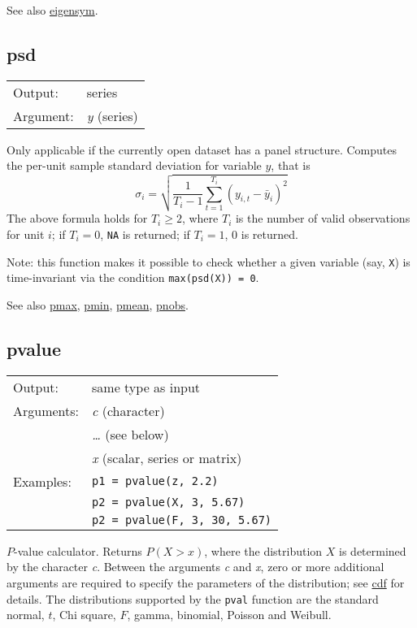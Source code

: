 	  See also \hyperlink{func-eigensym}{eigensym}.

\subsection{psd}
\hypertarget{func-psd}{}

\begin{tabular}{ll}
Output:     & series\\
Argument:   & \textsl{y} (series)\\
\end{tabular}

	  Only applicable if the currently open dataset has a panel
	  structure. Computes the per-unit sample standard deviation for
	  variable \ensuremath{y}, that is 
	  \[ \sigma_i = \sqrt{\frac{1}{T_i - 1} \sum_{t=1}^{T_i} 
	  (y_{i,t} - \bar{y}_i)^2 } \]
	  The above formula holds for $T_i \ge 2$, where $T_i$ is the
	  number of valid observations for unit $i$; if $T_i = 0$,
	  \texttt{NA} is returned; if $T_i = 1$, 0 is returned.

	  Note: this function makes it possible to check whether a given
	  variable (say, \texttt{X}) is time-invariant via the condition
	  \texttt{max(psd(X)) = 0}.

	  See also \hyperlink{func-pmax}{pmax}, \hyperlink{func-pmin}{pmin}, \hyperlink{func-pmean}{pmean}, \hyperlink{func-pnobs}{pnobs}.

\subsection{pvalue}
\hypertarget{func-pvalue}{}

\begin{tabular}{ll}
Output:     & same type as input\\
Arguments:  & \textsl{c} (character)\\
           & \textsl{\dots{}} (see below)\\
           & \textsl{x} (scalar, series or matrix)\\
Examples:    & \texttt{p1 = pvalue(z, 2.2)} \\ 
 & \texttt{p2 = pvalue(X, 3, 5.67)} \\ 
 & \texttt{p2 = pvalue(F, 3, 30, 5.67)}
\end{tabular}

	  \ensuremath{P}-value calculator. Returns 
	  $P(X > x)$,
	  where the distribution \ensuremath{X} is determined by the
	  character \textsl{c}. Between the arguments
	  \textsl{c} and \textsl{x}, zero or more
	  additional arguments are required to specify the parameters of
	  the distribution; see \hyperlink{func-cdf}{cdf} for details.  The
	  distributions supported by the \texttt{pval} function are
	  the standard normal, \ensuremath{t}, Chi square, \ensuremath{F},
	  gamma, binomial, Poisson and Weibull.

